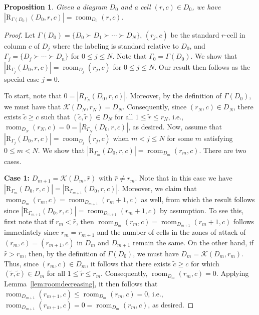 \documentclass[letterpaper,10pt]{article}
\newtheorem{prop}[theorem]{Proposition}
\DeclareMathOperator{\room}{room}
\begin{document}
\begin{prop}\label{prop:upperboundtight}
    Given a diagram $D_0$ and a cell $(r, c) \in D_0$, we have $|\mathrm{R}_{\Gamma(D_0)}(D_0,r, c)| = \room_{D_0}(r, c)$.
\end{prop}

\begin{proof}
Let $\Gamma(D_0) = \{D_0 \succ D_1 \succ \cdots \succ D_N\}$, $(r_j,c)$ be the standard $r$-cell in column $c$ of $D_j$ where the labeling is standard relative to $D_0$, and $\Gamma_j=\{D_j\succ\cdots\succ D_n\}$ for $0\le j\le N$. Note that $\Gamma_0=\Gamma(D_0)$. We show that $|\mathrm{R}_{\Gamma_j}(D_0,r, c)| = \room_{D_j}(r_j, c)$ for $0\le j\le N$. Our result then follows as the special case $j=0$.

To start, note that $0=|R_{\Gamma_N}(D_0,r,c)|$. Moreover, by the definition of $\Gamma(D_0)$, we must have that $\mathcal{K}(D_N,r_N)=D_N$. Consequently, since $(r_N,c)\in D_N$, there exists $\tilde{c}\ge c$ such that $(\tilde{c},\tilde{r})\in D_N$ for all $1\le \tilde{r}\le r_N$, i.e., $\room_{D_N}(r_N, c)=0=|R_{\Gamma_N}(D_0,r,c)|$, as desired. Now, assume that $|\mathrm{R}_{\Gamma_j}(D_0,r, c)| = \room_{D_j}(r_j, c)$ when $m<j\le N$ for some $m$ satisfying $0\le m<N$. We show that $|\mathrm{R}_{\Gamma_m}(D_0,r, c)| = \room_{D_m}(r_m, c)$. There are two cases.
\bigskip

\noindent
\textbf{Case 1:} $D_{m+1}=\mathcal{K}(D_m,\widehat{r})$ with $\widehat{r}\neq r_m$. Note that in this case we have $|\mathrm{R}_{\Gamma_m}(D_0,r, c)|=|\mathrm{R}_{\Gamma_{m+1}}(D_0,r, c)|$. Moreover, we claim that $\room_{D_m}(r_m, c)=\room_{D_{m+1}}(r_m+1, c)$ as well, from which the result follows since $|\mathrm{R}_{\Gamma_{m+1}}(D_0,r, c)|=\room_{D_{m+1}}(r_m+1, c)$ by assumption. To see this, first note that if $r_m<\widehat{r}$, then $\room_{D_m}(r_m, c)=\room_{D_{m+1}}(r_m+1, c)$ follows immediately since $r_m=r_{m+1}$ and the number of cells in the zones of attack of $(r_m,c)=(r_{m+1},c)$ in $D_m$ and $D_{m+1}$ remain the same. On the other hand, if $\widehat{r}>r_m$, then, by the definition of $\Gamma(D_0)$, we must have $D_m=\mathcal{K}(D_m,r_m)$. Thus, since $(r_m,c)\in D_m$, it follows that there exists $\tilde{c}\ge c$ for which $(\tilde{r},\tilde{c})\in D_m$ for all $1\le \tilde{r}\le r_m$. Consequently, $\room_{D_m}(r_m, c)=0$. Applying Lemma~\ref{lem:roomdecreasing}, it then follows that $\room_{D_{m+1}}(r_{m+1}, c)\le \room_{D_m}(r_m, c)=0$, i.e., $\room_{D_{m+1}}(r_{m+1}, c)=0=\room_{D_m}(r_m, c)$, as desired.
\bigskip


\end{proof}
\end{document}
